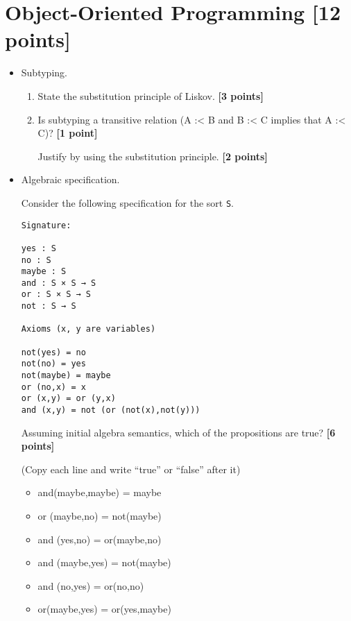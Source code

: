 \documentclass{article}
\begin{document}
\newpage
\section{Object-Oriented Programming [12 points]}

\begin{itemize}

\item Subtyping.

\begin{enumerate}
\item State the substitution principle of Liskov. \hfill{\textbf{[3 points]}}

\item Is subtyping a transitive relation (A :\textless{} B and B
:\textless{} C implies that A :\textless{} C)? 
\hfill{\textbf{[1 point]}}

Justify by using the
substitution principle. \hfill{\textbf{[2 points]}}
\end{enumerate}

\item Algebraic specification.

Consider the following specification for the sort \verb!S!.

\begin{verbatim}
Signature:

yes : S
no : S
maybe : S
and : S × S → S
or : S × S → S
not : S → S

Axioms (x, y are variables)

not(yes) = no
not(no) = yes
not(maybe) = maybe
or (no,x) = x
or (x,y) = or (y,x)
and (x,y) = not (or (not(x),not(y)))
\end{verbatim}

Assuming initial algebra semantics, which of the propositions are
true? \hfill{\textbf{[6 points]}}

(Copy each line and write ``true'' or ``false'' after it)

\begin{itemize}
\item
  and(maybe,maybe) = maybe
\item
  or (maybe,no) = not(maybe)
\item
  and (yes,no) = or(maybe,no)
\item
  and (maybe,yes) = not(maybe)
\item
  and (no,yes) = or(no,no)
\item
  or(maybe,yes) = or(yes,maybe)
\end{itemize}
\end{itemize}


\newpage
\end{document}
